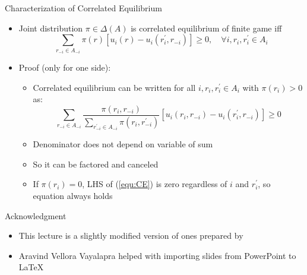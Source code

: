 \documentclass[11pt,aspectratio=169]{beamer}
\begin{document}
  \begin{frame}{Characterization of Correlated Equilibrium}
   \begin{itemize}[<+->] 
    \item Joint distribution $\pi \in \Delta(A)$ is correlated equilibrium of finite game iff
    \begin{equation}
    \label{equ:CE}
     \sum_{r_{-i} \in A_{-i}} \pi(r) \left[u_i(r) - u_i(r^{\prime}_i, r_{-i})\right] \ge 0,\quad  \forall i, r_i, r^{\prime}_i \in A_i
    \end{equation}
    \item Proof (only for one side):
    \begin{itemize}
     \item Correlated equilibrium can be written for all $i, r_i, r^{\prime}_i \in A_i$ with $\pi(r_i) > 0$ as:
     $$
      \sum_{r_{-i} \in A_{-i}} \frac{\pi(r_i,r_{-i})}{\sum_{r^{\prime}_{-i} \in A_{-i}} \pi(r_i, r^{\prime}_{-i})} \left[u_i(r_i, r_{-i}) - u_i(r^{\prime}_i, r_{-i})\right] \ge 0
     $$
     \item Denominator does not depend on variable of sum
     \item So it can be factored and canceled
     \item If $\pi(r_i) = 0$, LHS of (\ref{equ:CE}) is zero regardless of $i$ and $r^{\prime}_i$, so equation always holds
    \end{itemize}
   \end{itemize}
  \end{frame}
  
  \begin{frame}{Acknowledgment}
   \begin{itemize}
    \setlength{\itemsep}{1em}
    \item This lecture is a slightly modified version of ones prepared by
    \item Aravind Vellora Vayalapra helped with importing slides from PowerPoint to \LaTeX
   \end{itemize}
  \end{frame}
 
\end{document}
